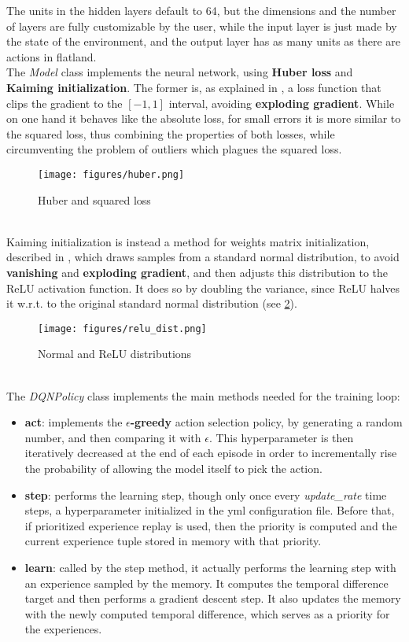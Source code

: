 \noindent 
The units in the hidden layers default to 64, but the dimensions and the number of layers are fully customizable by the user, while the input layer is just made by the state of the environment, and the output layer has as many units as there are actions in flatland. \\ The \textit{Model} class implements the neural network, using \textbf{Huber loss} and \textbf{Kaiming initialization}. The former is, as explained in \cite{huber}, a loss function that clips the gradient to the $[-1,1]$ interval, avoiding \textbf{exploding gradient}. While on one hand it behaves like the absolute loss, for small errors it is more similar to the squared loss, thus combining the properties of both losses, while circumventing the problem of outliers which plagues the squared loss.\\
\begin{figure}[H] 
\texttt{[image: figures/huber.png]}
\centering
\caption{Huber and squared loss}
\label{fig:s2} 
\end{figure}
\noindent
 \\ Kaiming initialization is instead a method for weights matrix initialization, described in \cite{kaiming}, which draws samples from a standard normal distribution, to avoid \textbf{vanishing} and \textbf{exploding gradient}, and then adjusts this distribution to the ReLU activation function. It does so by doubling the variance, since ReLU halves it w.r.t. to the original standard normal distribution (see \ref{fig:s3}).
 
 \begin{figure}[H] 
\texttt{[image: figures/relu\_dist.png]}
\centering
\caption{Normal and ReLU distributions}
\label{fig:s3} 
\end{figure}

\noindent
\\
The \textit{DQNPolicy} class implements the main methods needed for the training loop:
\begin{itemize}
\item \textbf{act}: implements the \textbf{$\epsilon$-greedy} action selection policy, by generating a random number, and then comparing it with $\epsilon$. This hyperparameter is then iteratively decreased at the end of each episode in order to incrementally rise the probability of allowing the model itself to pick the action.
\item \textbf{step}: performs the learning step, though only once every \textit{update\_rate} time steps, a hyperparameter initialized in the yml configuration file. Before that, if prioritized experience replay is used, then the priority is computed and the current experience tuple stored in memory with that priority.
\item \textbf{learn}: called by the step method, it actually performs the learning step with an experience sampled by the memory. It computes the temporal difference target and then performs a gradient descent step. It also updates the memory with the newly computed temporal difference, which serves as a priority for the experiences.
\end{itemize}


